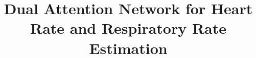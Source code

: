\documentclass[conference]{IEEEtran}
\begin{document}
\title{Dual Attention Network for Heart Rate and Respiratory Rate Estimation\\
{%
}
}

\makeatletter

\def\ps@IEEEtitlepagestyle{%
  \def\@oddfoot{\mycopyrightnotice}%
  \def\@evenfoot{}%
}
\def\mycopyrightnotice{%
  {\footnotesize
  \text{978-1-6654-3288-7/21/\$31.00\textcopyright 2021IEEE}
  }
  \gdef\mycopyrightnotice{}%
}



\makeatother


\iftrue 
\author{
}
\fi
\iffalse    
\author{\IEEEauthorblockN{Yuzhuo Ren}
\IEEEauthorblockA{%
\textit{NVIDIA}\\
Santa Clara, USA \\
yren@nvidia.com}
\and
\IEEEauthorblockN{Braeden Syrnyk}
\IEEEauthorblockA{%
\textit{NVIDIA}\\
Santa Clara, USA \\
bsyrnyk@nvidia.com}
\and
\IEEEauthorblockN{Niranjan Avadhanam}
\IEEEauthorblockA{%
\textit{NVIDIA}\\
Santa Clara, USA \\
navadhanam@nvidia.com}

}
\fi
\end{document}
